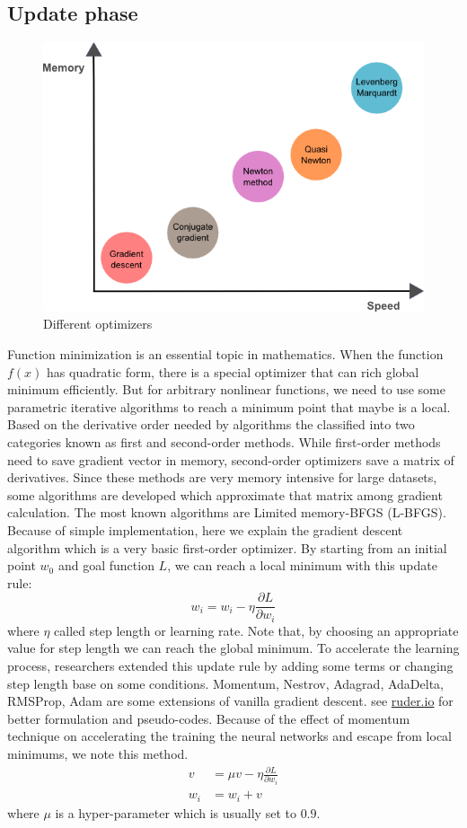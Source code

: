 \documentclass[10pt]{SelfArx} %
\begin{document}
	\subsection{Update phase}
	\begin{figure}\centering 
		\includegraphics[width=\linewidth]{img/optimizer}
		\caption{Different optimizers}
	\end{figure}
	Function minimization is an essential topic in mathematics. When the function $f(x)$ has quadratic form, there is a special optimizer that can rich global minimum efficiently. But for arbitrary nonlinear functions, we need to use some parametric iterative algorithms to reach a minimum point that maybe is a local. Based on the derivative order needed by algorithms the classified into two categories known as first and second-order methods. While first-order methods need to save gradient vector in memory, second-order optimizers save a matrix of derivatives. Since these methods are very memory intensive for large datasets, some algorithms are developed which approximate that matrix among gradient calculation. The most known algorithms are Limited memory-BFGS (L-BFGS). Because of simple implementation, here we explain the gradient descent algorithm which is a very basic first-order optimizer.
	By starting from an initial point $w_0$ and goal function $L$, we can reach a local minimum with this update rule:
	\begin{equation}
	w_i = w_i - \eta \frac{\partial L}{\partial w_i}
	\end{equation}
	where $\eta$ called step length or learning rate. Note that, by choosing an appropriate value for step length we can reach the global minimum. To accelerate the learning process, researchers extended this update rule by adding some terms or changing step length base on some conditions. Momentum, Nestrov, Adagrad, AdaDelta, RMSProp, Adam are some extensions of vanilla gradient descent. see \href{https://ruder.io/optimizing-gradient-descent/}{ruder.io} for better formulation and pseudo-codes. Because of the effect of momentum technique on accelerating the training the neural networks and escape from local minimums, we note this method. 
		\begin{align*}
		v &= \mu v - \eta \frac{\partial L}{\partial w_i}\\
	w_i &= w_i + v
	\end{align*}
	where $\mu$ is a hyper-parameter which is usually set to $0.9$.
\end{document}
